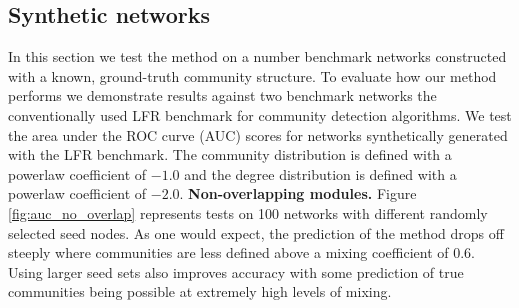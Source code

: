 \documentclass[manuscript, proceedings]{acmart}
\begin{document}
\subsection{Synthetic networks}
In this section we test the method on a number benchmark networks constructed with a known, ground-truth community structure.
To evaluate how our method performs we demonstrate results against two benchmark networks the conventionally used LFR benchmark \cite{lfr} for community detection algorithms.
We test the area under the ROC curve (AUC) scores for networks synthetically generated with the LFR benchmark.
The community distribution is defined with a powerlaw coefficient of $-1.0$ and the degree distribution is defined with a powerlaw coefficient of $-2.0$.
\textbf{Non-overlapping modules.} Figure \ref{fig:auc_no_overlap} represents tests on 100 networks with different randomly selected seed nodes.
As one would expect, the prediction of the method drops off steeply where communities are less defined above a mixing coefficient of 0.6.
Using larger seed sets also improves accuracy with some prediction of true communities being possible at extremely high levels of mixing.
\end{document}

